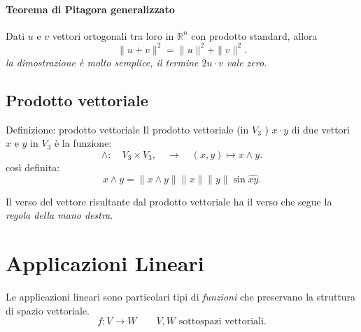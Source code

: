 \documentclass[x11names]{article}
\begin{document}
\begin{center}
\colorbox{Bisque1}{\begin{minipage}{5.75in}
\begin{yes}{}
\paragraph{Teorema di Pitagora generalizzato}
Dati $u$ e $v$ vettori ortogonali tra loro in $\mathbb{R}^n$ con prodotto standard, allora
\[
\|u+v\|^2 = \|u\|^2 + \|v\|^2
.\] 
\textit{la dimostrazione è molto semplice, il termine $2u\cdot v$ vale zero.}
\end{yes}
\end{minipage}}        
\end{center}


\subsection{Prodotto vettoriale}

\begin{center}
\colorbox{Azure2}{\begin{minipage}{5.75in}
\begin{blues}{Definizione: prodotto vettoriale}
Il prodotto vettoriale (in $V_3$ ) $x\cdot y$ di due vettori $x$ e $y$ in $V_3$ è la funzione:
\[
\wedge : \quad V_3 \times V_3, \quad \longrightarrow \quad \left(x,y\right) \mapsto x \wedge y
.\] 
così definita:
\[
x \wedge y  = \|x\wedge y\| \|x\| \|y\| \sin{\hat{xy}}
.\] 

\end{blues}
\end{minipage}}        
\end{center}
Il verso del vettore risultante dal prodotto vettoriale ha il verso che segue la \textit{regola della mano destra}.





\newpage
\section{Applicazioni Lineari}
Le applicazioni lineari sono particolari tipi di \textit{funzioni} che preservano la struttura di spazio vettoriale.
\[
f: V \longrightarrow W \qquad V,W \text{ sottospazi vettoriali}
.\] 
\end{document}
